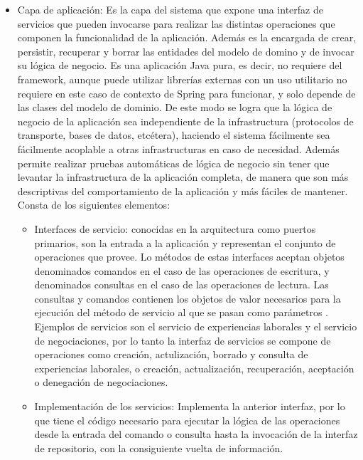 \documentclass[a4paper, 12pt]{book}
\begin{document}
\begin{itemize}
  \item Capa de aplicación: Es la capa del sistema que expone una interfaz de servicios que pueden invocarse para realizar las distintas operaciones que componen la funcionalidad de la aplicación. Además es la encargada de crear, persistir, recuperar y borrar las entidades del modelo de domino y de invocar su lógica de negocio.
Es una aplicación Java pura, es decir, no requiere del framework, aunque puede utilizar librerías externas con un uso utilitario no requiere en este caso de contexto de Spring para funcionar, y solo depende de las clases del modelo de dominio. 
De este modo se logra que la lógica de negocio de la aplicación sea independiente de la infrastructura (protocolos de transporte, bases de datos, etcétera), haciendo el sistema fácilmente sea fácilmente acoplable a otras infrastructuras en caso de necesidad. 
Además permite realizar pruebas automáticas de lógica de negocio sin tener que levantar la infrastructura de la aplicación completa, de manera que son más descriptivas del comportamiento de la aplicación y más fáciles de mantener.
Consta de los siguientes elementos:

	\begin{itemize}
	\item Interfaces de servicio: conocidas en la arquitectura como puertos primarios, son la entrada a la aplicación y representan el conjunto de operaciones que provee. Lo métodos de estas interfaces aceptan objetos denominados comandos en el caso de las operaciones de escritura, y denominados consultas en el caso de las operaciones de lectura.
	Las consultas y comandos contienen los objetos de valor necesarios para la ejecución del método de servicio al que se pasan como parámetros
	. Ejemplos de servicios son el servicio de experiencias laborales y el servicio de negociaciones, por lo tanto la interfaz de servicios se compone de operaciones como creación, actulización, borrado y consulta de experiencias laborales,
	o creación, actualización, recuperación, aceptación o denegación de negociaciones.

	\item Implementación de los servicios: Implementa la anterior interfaz, por lo que tiene el código necesario para ejecutar la lógica de las operaciones desde la entrada del comando o consulta hasta la invocación de la interfaz de repositorio, con la consiguiente vuelta de información.


\end{itemize}
\end{itemize}
\end{document}
